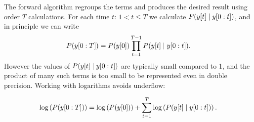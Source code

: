 The forward algorithm regroups the terms and produces the desired
result using order $T$ calculations.  For each time $t:\, 1 < t \leq
T$ we calculate $P({y}{[t]}\mid y[0:t])$, and in principle we can
write
\begin{equation*}
  P(y[0:T]) = P({y}{[0]}) \prod_{t=1}^{T-1} P({y}{[t]}\mid y[0:t]).
\end{equation*}
However the values of $P({y}{[t]}\mid y[0:t])$ are typically
small compared to 1, and the product of many such terms is too small
to be represented even in double precision.  Working with logarithms
avoids underflow:

\begin{equation}
  \mlabel{eq:logP}
  \log\left( P(\ts{y}{0}{T}) \right) = \log\left( P(\ti{y}{0})
 \right) + \sum_{t=1}^T \log\left( P(\ti{y}{t}\given \ts{y}{0}{t})\right).
\end{equation}

\newcommand{\alphax}[4]{%
  \colorbox{yellow}{%
    $P_{\ti{#1}{#2}\given \ts{Y}{0}{#3}}\left(#4 \given \ts{y}{0}{#3} \right)$%
  }%
}%
\newcommand{\StateForecast}[3]{%
  \colorbox{green}{%
    $P_{\ti{#1}{#3}\given \ts{Y}{0}{#3}} \left(#2 \given  \ts{y}{0}{#3} \right)$%
  }%
}%
\newcommand{\gammax}{%
  \colorbox{cyan}{%
    $P(\ti{y}{t}\given \ts{y}{0}{t})$%
  }%
}%
\newcommand{\JointForecast}[3]{%
  \colorbox{pink}{%
    $P_{\ti{#1}{#3},\ti{Y}{#3}\given \ts{Y}{0}{#3}} \left(#2,\ti{y}{#3}\given \ts{y}{0}{#3}\right)$%
  }%
}%

